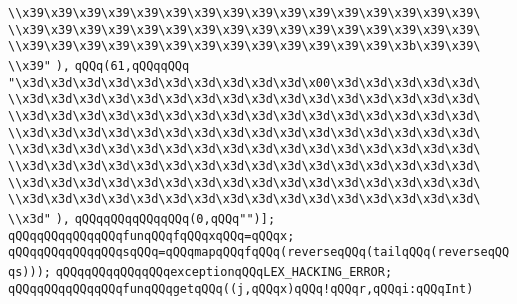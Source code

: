 \verb|\\x39\x39\x39\x39\x39\x39\x39\x39\x39\x39\x39\x39\x39\x39\x39\x39\|\newline
\verb|\\x39\x39\x39\x39\x39\x39\x39\x39\x39\x39\x39\x39\x39\x39\x39\x39\|\newline
\verb|\\x39\x39\x39\x39\x39\x39\x39\x39\x39\x39\x39\x39\x39\x3b\x39\x39\|\newline
\verb|\\x39"|\newline
\verb|),|\newline
\verb|qQQq(61,qQQqqQQq|\newline
\verb|"\x3d\x3d\x3d\x3d\x3d\x3d\x3d\x3d\x3d\x3d\x00\x3d\x3d\x3d\x3d\x3d\|\newline
\verb|\\x3d\x3d\x3d\x3d\x3d\x3d\x3d\x3d\x3d\x3d\x3d\x3d\x3d\x3d\x3d\x3d\|\newline
\verb|\\x3d\x3d\x3d\x3d\x3d\x3d\x3d\x3d\x3d\x3d\x3d\x3d\x3d\x3d\x3d\x3d\|\newline
\verb|\\x3d\x3d\x3d\x3d\x3d\x3d\x3d\x3d\x3d\x3d\x3d\x3d\x3d\x3d\x3d\x3d\|\newline
\verb|\\x3d\x3d\x3d\x3d\x3d\x3d\x3d\x3d\x3d\x3d\x3d\x3d\x3d\x3d\x3d\x3d\|\newline
\verb|\\x3d\x3d\x3d\x3d\x3d\x3d\x3d\x3d\x3d\x3d\x3d\x3d\x3d\x3d\x3d\x3d\|\newline
\verb|\\x3d\x3d\x3d\x3d\x3d\x3d\x3d\x3d\x3d\x3d\x3d\x3d\x3d\x3d\x3d\x3d\|\newline
\verb|\\x3d\x3d\x3d\x3d\x3d\x3d\x3d\x3d\x3d\x3d\x3d\x3d\x3d\x3d\x3d\x3d\|\newline
\verb|\\x3d"|\newline
\verb|),|\newline
\verb|qQQqqQQqqQQqqQQq(0,qQQq"")];|\newline
\verb|qQQqqQQqqQQqqQQqfunqQQqfqQQqxqQQq=qQQqx;|\newline
\verb|qQQqqQQqqQQqqQQqsqQQq=qQQqmapqQQqfqQQq(reverseqQQq(tailqQQq(reverseqQQqs)));|\newline
\verb|qQQqqQQqqQQqqQQqexceptionqQQqLEX_HACKING_ERROR;|\newline
\verb|qQQqqQQqqQQqqQQqfunqQQqgetqQQq((j,qQQqx)qQQq!qQQqr,qQQqi:qQQqInt)|\newline
